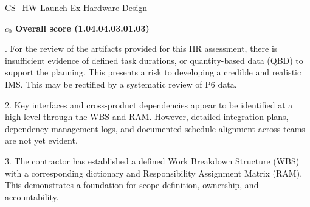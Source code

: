 % 


\begin{frame}{\href{run:../local/source-docs/1.04.04.03.01.03.pdf}{CS\_HW Launch Ex Hardware Design}}
\centering
{}
\par
\vspace{0.75em}
\textbf{\small{\(c_0\) Overall score {\tiny (1.04.04.03.01.03)}}}\\\par
\vspace{0.5em}
\begin{minipage}{0.85\textwidth}
\raggedright
\fontsize{7}{9}. For the review of the artifacts provided for this IIR assessment, there is insufficient evidence of defined task durations, or quantity-based data (QBD) to support the planning. This presents a risk to developing a credible and realistic IMS. This may be rectified by a systematic review of P6 data.\par\vspace{0.5em}2. Key interfaces and cross-product dependencies appear to be identified at a high level through the WBS and RAM. However, detailed integration plans, dependency management logs, and documented schedule alignment across teams are not yet evident.\par\vspace{0.5em}3. The contractor has established a defined Work Breakdown Structure (WBS) with a corresponding dictionary and Responsibility Assignment Matrix (RAM). This demonstrates a foundation for scope definition, ownership, and accountability.\par
\end{minipage}
\end{frame}
